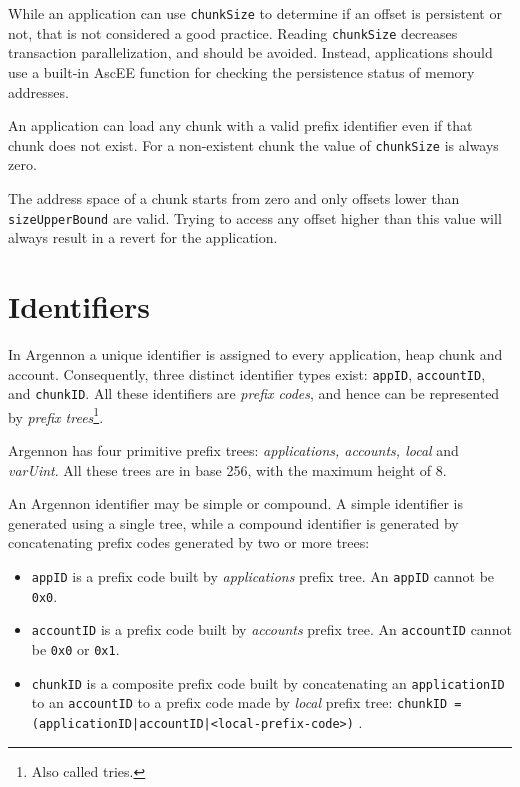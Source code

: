 While an application can use \texttt{chunkSize} to determine if an offset is persistent or not, that is not
considered a good practice. Reading \texttt{chunkSize} decreases transaction parallelization, and should be avoided.
Instead, applications should use a built-in AscEE function for checking the persistence status of memory addresses.

An application can load any chunk with a valid prefix identifier even if that chunk does not exist. For a non-existent
chunk the value of \texttt{chunkSize} is always zero.

The address space of a chunk starts from zero and only offsets lower than \texttt{sizeUpperBound} are valid. Trying to
access any offset higher than this value will always result in a revert for the application.

\section{Identifiers}\label{sec:identifiers}

In Argennon a unique identifier is assigned to every application, heap chunk and account. Consequently, three distinct
identifier types exist: \texttt{appID}, \texttt{accountID}, and \texttt{chunkID}.
All these identifiers are \emph{prefix codes}, and hence can be represented by
\emph{prefix trees}\footnote{Also called tries.}.

Argennon has four primitive prefix trees:
\emph{applications, accounts, local} and \emph{varUint}.
All these trees are in base 256, with the maximum height
of 8.

An Argennon identifier may be simple or compound. A simple identifier is generated using a single tree, while a
compound identifier is generated by concatenating prefix codes generated by two or more trees:

\begin{itemize}
    \item \texttt{appID} is a prefix code built by \emph{applications} prefix tree. An \texttt{appID} cannot
    be \texttt{0x0}.

    \item \texttt{accountID} is a prefix code built by \emph{accounts} prefix tree. An \texttt{accountID} cannot
    be \texttt{0x0} or \texttt{0x1}.

    \item \texttt{chunkID} is a composite prefix code built by concatenating an \texttt{applicationID} to
    an \texttt{accountID} to a prefix code made by \emph{local} prefix tree:
    \subitem \texttt{chunkID = (applicationID|accountID|<local-prefix-code>)} .
\end{itemize}

